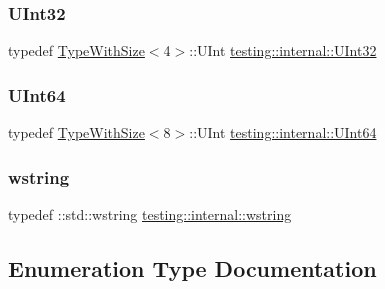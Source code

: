 \mbox{\label{namespacetesting_1_1internal_a40d4fffcd2bf56f18b1c380615aa85e3}} 
\subsubsection{\texorpdfstring{U\+Int32}{UInt32}}
{\footnotesize\ttfamily typedef \hyperlink{classtesting_1_1internal_1_1_type_with_size}{Type\+With\+Size}$<$4$>$\+::U\+Int \hyperlink{namespacetesting_1_1internal_a40d4fffcd2bf56f18b1c380615aa85e3}{testing\+::internal\+::\+U\+Int32}}

\mbox{\label{namespacetesting_1_1internal_aa6a1ac454e6d7e550fa4925c62c35caa}} 
\subsubsection{\texorpdfstring{U\+Int64}{UInt64}}
{\footnotesize\ttfamily typedef \hyperlink{classtesting_1_1internal_1_1_type_with_size}{Type\+With\+Size}$<$8$>$\+::U\+Int \hyperlink{namespacetesting_1_1internal_aa6a1ac454e6d7e550fa4925c62c35caa}{testing\+::internal\+::\+U\+Int64}}

\mbox{\label{namespacetesting_1_1internal_a3f543179329c353aee1d7b54a9a8e335}} 
\subsubsection{\texorpdfstring{wstring}{wstring}}
{\footnotesize\ttfamily typedef \+::std\+::wstring \hyperlink{namespacetesting_1_1internal_a3f543179329c353aee1d7b54a9a8e335}{testing\+::internal\+::wstring}}



\subsection{Enumeration Type Documentation}
\mbox{\label{namespacetesting_1_1internal_adfcd859062983a889f4bd18e6977357e}} 
